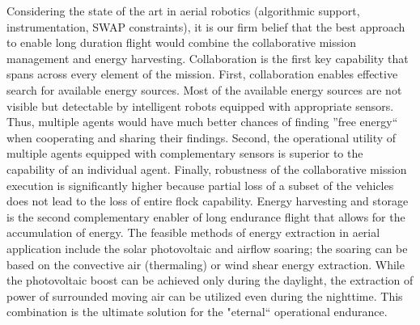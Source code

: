 \documentclass{ifacconf}
\begin{document}
Considering the state of the art in aerial robotics (algorithmic support, instrumentation, SWAP constraints), it is our firm belief that the best approach to enable long duration flight would combine the collaborative mission management and energy harvesting. Collaboration is the first key capability that spans across every element of the mission. First, collaboration enables effective search for available energy sources. Most of the available energy sources are not visible but detectable by intelligent robots equipped with appropriate sensors. Thus, multiple agents would have much better chances of finding ''free energy`` when cooperating and sharing their findings. Second, the operational utility of multiple agents equipped with complementary sensors is superior to the capability of an individual agent. Finally, robustness of the collaborative mission execution is significantly higher because partial loss of a subset of the vehicles does not lead to the loss of entire flock capability. Energy harvesting and storage is the second complementary enabler of long endurance flight that allows for the accumulation of energy. The feasible methods of energy extraction in aerial application include the solar photovoltaic and airflow soaring; the soaring can be based on the convective air (thermaling) or wind shear energy extraction. While the photovoltaic boost can be achieved only during the daylight, the extraction of power of surrounded moving air can be utilized even during the nighttime. This combination is the ultimate solution for the "eternal`` operational endurance.
\end{document}
